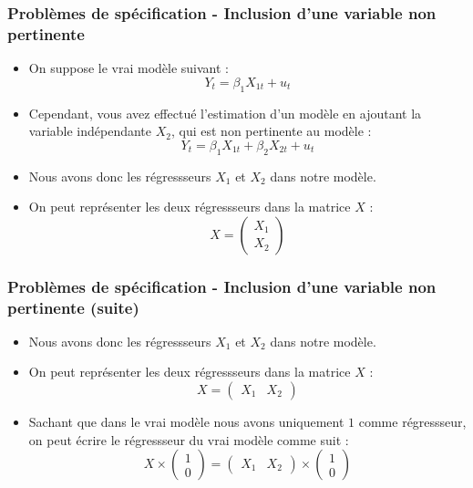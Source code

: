\documentclass{beamer}
\begin{document}
\begin{frame}
\frametitle{Problèmes de spécification - Inclusion d’une variable non pertinente}
\begin{itemize}
    \item On suppose le vrai modèle suivant :
    \[
    Y_t = \beta_1 X_{1t} + u_t
    \]
    \item Cependant, vous avez effectué l’estimation d’un modèle en ajoutant la variable indépendante \( X_2 \), qui est non pertinente au modèle :
    \[
    Y_t = \beta_1 X_{1t} + \beta_2 X_{2t} + u_t
    \]
    \item Nous avons donc les régressseurs \( X_1 \) et \( X_2 \) dans notre modèle.
    \item On peut représenter les deux régressseurs dans la matrice \( X \) :
    \[
    X = \begin{pmatrix} X_1 \\ X_2 \end{pmatrix}
    \]
\end{itemize}
\end{frame}

\begin{frame}
\frametitle{Problèmes de spécification - Inclusion d’une variable non pertinente (suite)}
\begin{itemize}
    \item Nous avons donc les régressseurs \( X_1 \) et \( X_2 \) dans notre modèle.
    \item On peut représenter les deux régressseurs dans la matrice \( X \) :
    \[
    X = \begin{pmatrix} X_1 & X_2 \end{pmatrix}
    \]
    \item Sachant que dans le vrai modèle nous avons uniquement \( 1 \) comme régressseur, on peut écrire le régressseur du vrai modèle comme suit :
    \[
    X \times \begin{pmatrix} 1 \\ 0 \end{pmatrix} = \begin{pmatrix} X_1 & X_2 \end{pmatrix} \times \begin{pmatrix} 1 \\ 0 \end{pmatrix}
    \]
\end{itemize}
\end{frame}
\end{document}
